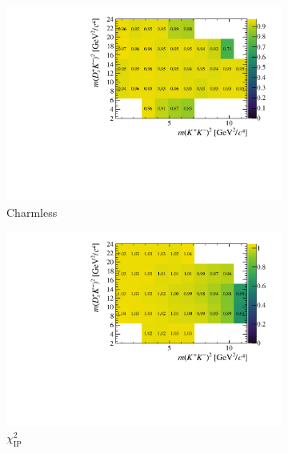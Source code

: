 \begin{figure}[!h]
   \centering
   \begin{subfigure}[t]{0.4\textwidth}
      \includegraphics[width=1.0\textwidth]{figs/B2DsKK/Relative_Eff_FDCHI2_All.pdf}
      \caption{Charmless}
   \end{subfigure}
   \begin{subfigure}[t]{0.4\textwidth}
      \includegraphics[width=1.0\textwidth]{figs/B2DsKK/Relative_Eff_Bcut_All.pdf}
      \caption{$\chi^{2}_{\text{IP}}$}
   \end{subfigure}
   \begin{subfigure}[t]{0.4\textwidth}

\end{subfigure}
\end{figure}
